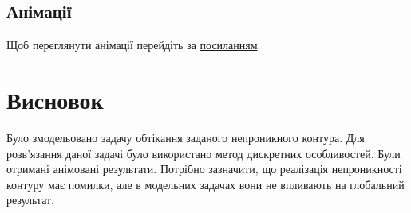 \documentclass[a4paper,12pt]{article}
\begin{document}
	\subsection{Анімації}
	Щоб переглянути анімації перейдіть за \href{https://github.com/AlKravets/nonclassical-optimization-lab2}{посиланням}.

\section{Висновок}
	Було змодельовано задачу обтікання заданого непроникного контура. Для розв'язання даної задачі було використано метод дискретних особливостей. Були отримані анімовані результати. Потрібно зазначити, що реалізація непроникності контуру має помилки, але в модельних задачах вони не впливають на глобальний результат.
\end{document}
